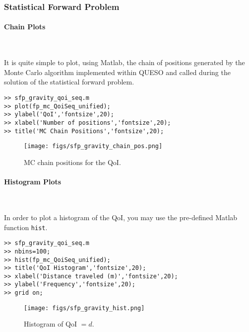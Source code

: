\newpage

\subsubsection{Statistical Forward Problem}


\paragraph{Chain Plots} \

It is quite simple to plot, using Matlab, the chain of positions generated by the Monte Carlo algorithm implemented within QUESO and called during the solution of the statistical forward problem. 

\begin{lstlisting}[label=matlab:chain_qoi,caption={Matlab code for the chain plot.}]
% inside Matlab
>> sfp_gravity_qoi_seq.m
>> plot(fp_mc_QoiSeq_unified);
>> ylabel('QoI','fontsize',20);
>> xlabel('Number of positions','fontsize',20);
>> title('MC Chain Positions','fontsize',20);
\end{lstlisting}

\begin{figure}[p]
\centering 
\texttt{[image: figs/sfp\_gravity\_chain\_pos.png]}
\vspace*{-10pt}
\caption{MC chain positions for the QoI.}
\label{fig:sfp_gravity_chain}
\end{figure}

\paragraph{Histogram Plots} \

In order to plot a histogram of the QoI, you may use the pre-defined Matlab function \verb+hist+.
%
\begin{lstlisting}[label=matlab:hist_qoi,caption={Matlab code for the QoI histogram plot.}]
>> sfp_gravity_qoi_seq.m
>> nbins=100;
>> hist(fp_mc_QoiSeq_unified);
>> title('QoI Histogram','fontsize',20);
>> xlabel('Distance traveled (m)','fontsize',20);
>> ylabel('Frequency','fontsize',20);
>> grid on;
\end{lstlisting}

\begin{figure}[p]
\centering 
\texttt{[image: figs/sfp\_gravity\_hist.png]}
\vspace{-10pt}
\caption{Histogram of QoI $=d$.}
\label{fig:sfp_gravity_hist}
\end{figure}

